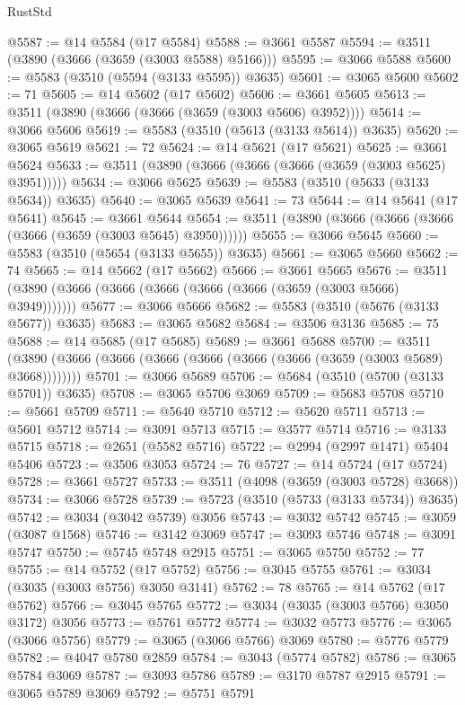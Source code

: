 \begin{lexlean}{RustStd}
\begin{coremodule}
@5587 := @14 @5584 (@17 @5584)
@5588 := @3661 @5587
@5594 := @3511 (@3890 (@3666 (@3659 (@3003 @5588) @5166)))
@5595 := @3066 @5588
@5600 := @5583 (@3510 (@5594 (@3133 @5595)) @3635)
@5601 := @3065 @5600
@5602 := 71
@5605 := @14 @5602 (@17 @5602)
@5606 := @3661 @5605
@5613 := @3511 (@3890 (@3666 (@3666 (@3659 (@3003 @5606) @3952))))
@5614 := @3066 @5606
@5619 := @5583 (@3510 (@5613 (@3133 @5614)) @3635)
@5620 := @3065 @5619
@5621 := 72
@5624 := @14 @5621 (@17 @5621)
@5625 := @3661 @5624
@5633 := @3511 (@3890 (@3666 (@3666 (@3666 (@3659 (@3003 @5625) @3951)))))
@5634 := @3066 @5625
@5639 := @5583 (@3510 (@5633 (@3133 @5634)) @3635)
@5640 := @3065 @5639
@5641 := 73
@5644 := @14 @5641 (@17 @5641)
@5645 := @3661 @5644
@5654 := @3511 (@3890 (@3666 (@3666 (@3666 (@3666 (@3659 (@3003 @5645) @3950))))))
@5655 := @3066 @5645
@5660 := @5583 (@3510 (@5654 (@3133 @5655)) @3635)
@5661 := @3065 @5660
@5662 := 74
@5665 := @14 @5662 (@17 @5662)
@5666 := @3661 @5665
@5676 := @3511 (@3890 (@3666 (@3666 (@3666 (@3666 (@3666 (@3659 (@3003 @5666) @3949)))))))
@5677 := @3066 @5666
@5682 := @5583 (@3510 (@5676 (@3133 @5677)) @3635)
@5683 := @3065 @5682
@5684 := @3506 @3136
@5685 := 75
@5688 := @14 @5685 (@17 @5685)
@5689 := @3661 @5688
@5700 := @3511 (@3890 (@3666 (@3666 (@3666 (@3666 (@3666 (@3666 (@3659 (@3003 @5689) @3668))))))))
@5701 := @3066 @5689
@5706 := @5684 (@3510 (@5700 (@3133 @5701)) @3635)
@5708 := @3065 @5706 @3069
@5709 := @5683 @5708
@5710 := @5661 @5709
@5711 := @5640 @5710
@5712 := @5620 @5711
@5713 := @5601 @5712
@5714 := @3091 @5713
@5715 := @3577 @5714
@5716 := @3133 @5715
@5718 := @2651 (@5582 @5716)
@5722 := @2994 (@2997 @1471) @5404 @5406
@5723 := @3506 @3053
@5724 := 76
@5727 := @14 @5724 (@17 @5724)
@5728 := @3661 @5727
@5733 := @3511 (@4098 (@3659 (@3003 @5728) @3668))
@5734 := @3066 @5728
@5739 := @5723 (@3510 (@5733 (@3133 @5734)) @3635)
@5742 := @3034 (@3042 @5739) @3056
@5743 := @3032 @5742
@5745 := @3059 (@3087 @1568)
@5746 := @3142 @3069
@5747 := @3093 @5746
@5748 := @3091 @5747
@5750 := @5745 @5748 @2915
@5751 := @3065 @5750
@5752 := 77
@5755 := @14 @5752 (@17 @5752)
@5756 := @3045 @5755
@5761 := @3034 (@3035 (@3003 @5756) @3050 @3141)
@5762 := 78
@5765 := @14 @5762 (@17 @5762)
@5766 := @3045 @5765
@5772 := @3034 (@3035 (@3003 @5766) @3050 @3172) @3056
@5773 := @5761 @5772
@5774 := @3032 @5773
@5776 := @3065 (@3066 @5756)
@5779 := @3065 (@3066 @5766) @3069
@5780 := @5776 @5779
@5782 := @4047 @5780 @2859
@5784 := @3043 (@5774 @5782)
@5786 := @3065 @5784 @3069
@5787 := @3093 @5786
@5789 := @3170 @5787 @2915
@5791 := @3065 @5789 @3069
@5792 := @5751 @5791

\end{coremodule}
\end{lexlean}
